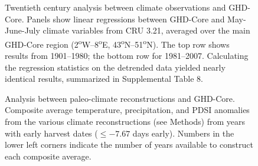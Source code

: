 \documentclass[final]{nature}
\begin{document}
\begin{figure}
\caption{Twentieth century analysis between climate observations and GHD-Core. Panels show linear regressions between GHD-Core and May-June-July climate variables from CRU 3.21, averaged over the main GHD-Core region (2\textsuperscript{o}W--8\textsuperscript{o}E, 43\textsuperscript{o}N--51\textsuperscript{o}N). The top row shows results from 1901--1980; the bottom row for 1981--2007. Calculating the regression statistics on the detrended data yielded nearly identical results, summarized in Supplemental Table 8.}
\end{figure}

\begin{figure}
\caption{Analysis between paleo-climate reconstructions and GHD-Core. Composite average temperature, precipitation, and PDSI anomalies from the various climate reconstructions (see Methods) from years with early harvest dates ($\le-7.67$ days early). Numbers in the lower left corners indicate the number of years available to construct each composite average.}
\end{figure}

\end{document}

